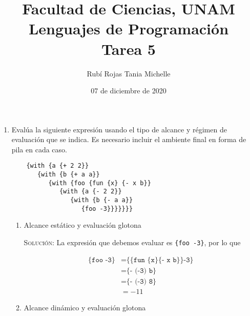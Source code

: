 \documentclass[letterpaper,11pt]{article}
\title{Facultad de Ciencias, UNAM \\ 
       Lenguajes de Programación\\ 
       Tarea 5}
\author{Rubí Rojas Tania Michelle}
\date{07 de diciembre de 2020}
\begin{document}
\maketitle

\begin{enumerate}
    \item Evalúa la siguiente expresión usando el tipo de alcance y régimen de 
    evaluación que se indica. Es necesario incluir el ambiente final en forma 
    de pila en cada caso. 
    \begin{verbatim}
    {with {a {+ 2 2}}
       {with {b {+ a a}}
          {with {foo {fun {x} {- x b}}
             {with {a {- 2 2}}
                {with {b {- a a}}
                   {foo -3}}}}}}}
    \end{verbatim}

    \begin{enumerate}
        \item Alcance estático y evaluación glotona

        \textsc{Solución:} La expresión que debemos evaluar es 
        \texttt{\{foo -3\}}, por lo que 
        \begin{table}[h]
            \parbox{.6\linewidth}{
            \centering
            \begin{align*}
                \texttt{\{foo -3\}} 
                &= \texttt{\{\{fun \{x\} \{- x b\}\} -3\}} \\
                &= \texttt{\{- (-3) b\}} \\
                &= \texttt{\{- (-3) 8\}} \\
                &= -11
            \end{align*}
            }
            \hfill
            \parbox{.4\linewidth}{
            \centering
            \begin{drawstack}[scale=1.15]
            \end{drawstack}
            }
        \end{table}

        \newpage
        \item Alcance dinámico y evaluación glotona 


\end{enumerate}
\end{enumerate}
\end{document}

